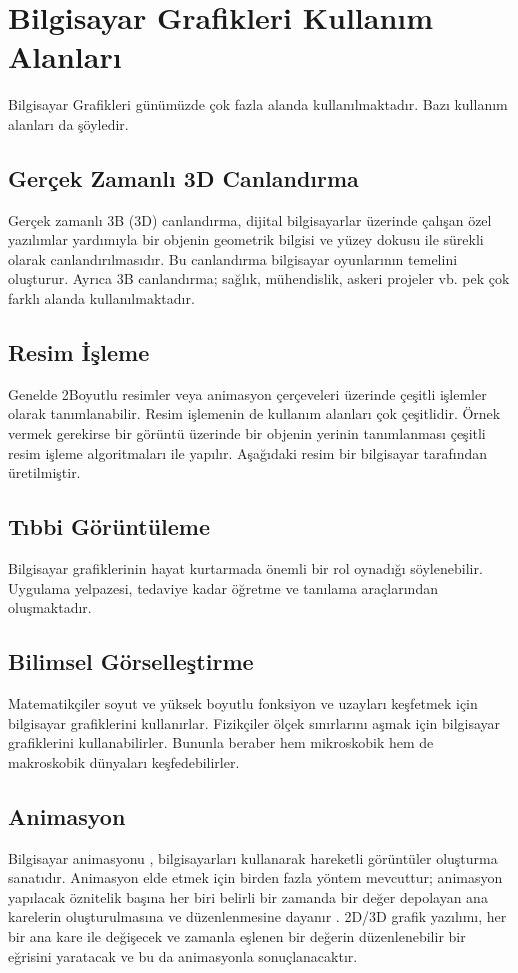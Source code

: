 \documentclass{IEEEtran}
\begin{document}
\section{Bilgisayar Grafikleri Kullanım Alanları}
\label{sec:kullanimalanlari}
Bilgisayar Grafikleri günümüzde çok fazla alanda kullanılmaktadır. Bazı kullanım alanları da şöyledir.

\subsection{Gerçek Zamanlı 3D Canlandırma}
Gerçek zamanlı 3B (3D) canlandırma, dijital bilgisayarlar üzerinde çalışan özel yazılımlar yardımıyla bir objenin geometrik bilgisi ve yüzey dokusu ile sürekli olarak canlandırılmasıdır. Bu canlandırma bilgisayar oyunlarının temelini oluşturur. Ayrıca 3B canlandırma; sağlık, mühendislik, askeri projeler vb. pek çok farklı alanda kullanılmaktadır. \cite{ebergi}

\subsection{Resim İşleme}
Genelde 2Boyutlu resimler veya animasyon çerçeveleri üzerinde çeşitli işlemler olarak tanımlanabilir. Resim işlemenin de kullanım alanları çok çeşitlidir. Örnek vermek gerekirse bir görüntü üzerinde bir objenin yerinin tanımlanması çeşitli resim işleme algoritmaları ile yapılır. Aşağıdaki resim bir bilgisayar tarafından üretilmiştir.\cite{ebergi}

\subsection{Tıbbi Görüntüleme}
 Bilgisayar grafiklerinin hayat kurtarmada önemli bir rol oynadığı söylenebilir.
Uygulama yelpazesi, tedaviye kadar öğretme ve tanılama araçlarından
oluşmaktadır.\cite{omercetin}

\subsection{Bilimsel Görselleştirme}
 Matematikçiler soyut ve yüksek
boyutlu fonksiyon ve uzayları keşfetmek için bilgisayar grafiklerini kullanırlar.
Fizikçiler ölçek sınırlarını aşmak için bilgisayar grafiklerini kullanabilirler.
Bununla beraber hem mikroskobik hem de makroskobik dünyaları
keşfedebilirler.\cite{bilimselgorsellestirme}

\subsection{Animasyon}
Bilgisayar animasyonu , bilgisayarları kullanarak hareketli görüntüler oluşturma sanatıdır. Animasyon elde etmek için birden fazla yöntem mevcuttur; animasyon yapılacak öznitelik başına her biri belirli bir zamanda bir değer depolayan ana karelerin oluşturulmasına ve düzenlenmesine dayanır . 2D/3D grafik yazılımı, her bir ana kare ile değişecek ve zamanla eşlenen bir değerin düzenlenebilir bir eğrisini yaratacak ve bu da animasyonla sonuçlanacaktır.\cite{omercetin}
\end{document}
